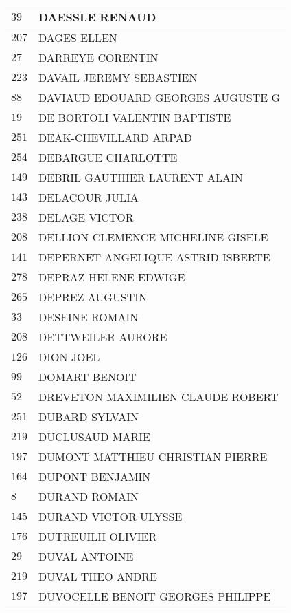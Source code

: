\begin{xltabular}{\linewidth}{|l|X|}
    \hline
    $39$ & DAESSLE RENAUD \\
    \hline
    $207$ & DAGES ELLEN \\
    \hline
    $27$ & DARREYE CORENTIN \\
    \hline
    $223$ & DAVAIL JEREMY SEBASTIEN \\
    \hline
    $88$ & DAVIAUD EDOUARD GEORGES AUGUSTE G \\
    \hline
    $19$ & DE BORTOLI VALENTIN BAPTISTE \\
    \hline
    $251$ & DEAK-CHEVILLARD ARPAD \\
    \hline
    $254$ & DEBARGUE CHARLOTTE \\
    \hline
    $149$ & DEBRIL GAUTHIER LAURENT ALAIN \\
    \hline
    $143$ & DELACOUR JULIA \\
    \hline
    $238$ & DELAGE VICTOR \\
    \hline
    $208$ & DELLION CLEMENCE MICHELINE GISELE \\
    \hline
    $141$ & DEPERNET ANGELIQUE ASTRID ISBERTE \\
    \hline
    $278$ & DEPRAZ HELENE EDWIGE \\
    \hline
    $265$ & DEPREZ AUGUSTIN \\
    \hline
    $33$ & DESEINE ROMAIN \\
    \hline
    $208$ & DETTWEILER AURORE \\
    \hline
    $126$ & DION JOEL \\
    \hline
    $99$ & DOMART BENOIT \\
    \hline
    $52$ & DREVETON MAXIMILIEN CLAUDE ROBERT \\
    \hline
    $251$ & DUBARD SYLVAIN \\
    \hline
    $219$ & DUCLUSAUD MARIE \\
    \hline
    $197$ & DUMONT MATTHIEU CHRISTIAN PIERRE \\
    \hline
    $164$ & DUPONT BENJAMIN \\
    \hline
    $8$ & DURAND ROMAIN \\
    \hline
    $145$ & DURAND VICTOR ULYSSE \\
    \hline
    $176$ & DUTREUILH OLIVIER \\
    \hline
    $29$ & DUVAL ANTOINE \\
    \hline
    $219$ & DUVAL THEO ANDRE \\
    \hline
    $197$ & DUVOCELLE BENOIT GEORGES PHILIPPE \\
    \hline

\end{xltabular}
